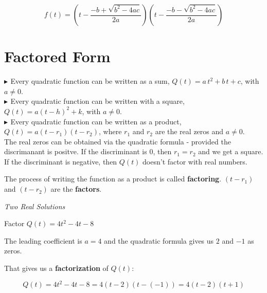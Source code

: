\documentclass{ximera}
\begin{document}
\[ f(t) =  \left(t - \frac{-b + \sqrt{b^2 - 4 a c}}{2a}\right)   \left(t -  \frac{-b - \sqrt{b^2 - 4 a c}}{2a}\right)   \]







\section{Factored Form}

\textbf{\textcolor{red!90!darkgray}{$\blacktriangleright$ }} Every quadratic function can be written as a sum, $Q(t) = a \, t^2 + b \, t + c$, with $a \ne 0$. \\



\textbf{\textcolor{red!90!darkgray}{$\blacktriangleright$ }} Every quadratic function can be written with a square, $Q(t) = a (t - h)^2 + k$, with $a \ne 0$. \\



\textbf{\textcolor{red!90!darkgray}{$\blacktriangleright$ }} Every quadratic function can be written as a product, $Q(t) = a (t - r_1)(t - r_2)$, where $r_1$ and $r_2$ are the real zeros and $a \ne 0$. \\





The real zeros can be obtained via the quadratic formula - provided the discrimanant is positve.  If the discriminant is $0$, then $r_1 = r_2$ and we get a square.  If the discriminant is negative, then $Q(t)$ doesn't factor with real numbers.  


The process of writing the function as a product is called \textbf{factoring}. $(t - r_1)$  and $(t - r_2)$ are the \textbf{factors}.



\begin{example} \textit{Two Real Solutions} 

Factor $Q(t) = 4 t^2 - 4 t - 8$ 

\begin{explanation}

The leading coefficient is $a=4$ and the quadratic formula gives us $2$ and $-1$ as zeros.  

That gives us a \textbf{factorization} of $Q(t)$:



\[    Q(t) = 4 t^2 - 4 t - 8 =  4 (t-2)(t-(-1))    = 4 (t-2)(t+1)         \]

\end{explanation}

\end{example}
\end{document}
